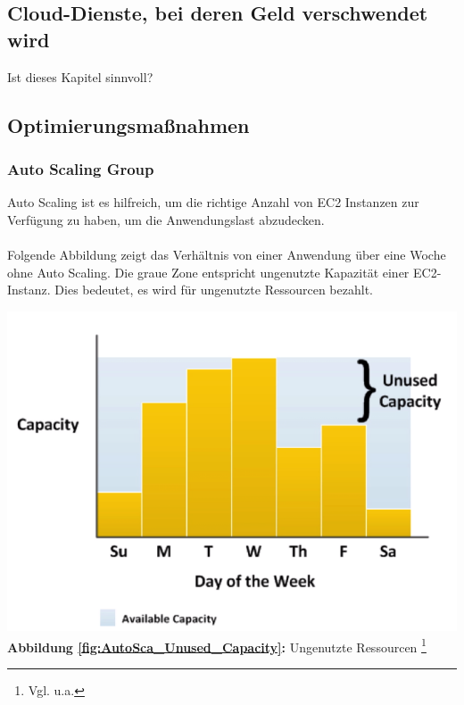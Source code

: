 \paragraph{}

\subsection{Cloud-Dienste, bei deren Geld verschwendet wird}
Ist dieses Kapitel sinnvoll?

\subsection{Optimierungsmaßnahmen}

\subsubsection{Auto Scaling Group }
Auto Scaling ist es hilfreich, um die richtige Anzahl von EC2 Instanzen zur Verfügung zu haben, um die Anwendungslast abzudecken.
\\\\
Folgende Abbildung zeigt das Verhältnis von einer Anwendung über eine Woche ohne Auto Scaling.
Die graue Zone entspricht ungenutzte Kapazität einer EC2-Instanz. Dies bedeutet, es wird für ungenutzte Ressourcen bezahlt.
\begin{center}
    \includegraphics[scale=0.7]{sources/AutoCap Unused Capacity}\label{fig:AutoSca_Unused_Capacity}\\
    \textbf{Abbildung \autoref{fig:AutoSca_Unused_Capacity}:} Ungenutzte Ressourcen
    \footnote{Vgl. u.a.\cite{AMZ01}}
\end{center}


